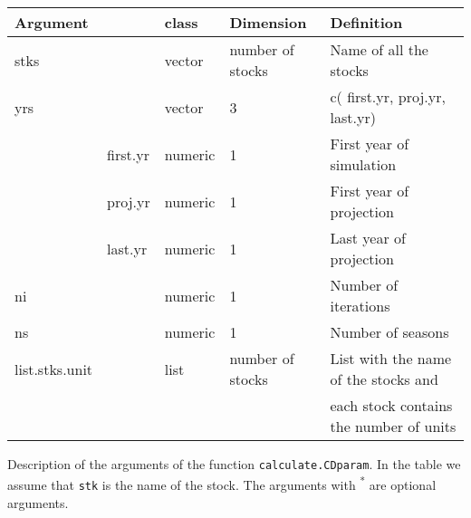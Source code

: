 \begin{landscape}
\begin{table}[!ht]
\begin{footnotesize}
    \begin{tabular}{lllll} %
      \hline 
      Argument & & class & Dimension & Definition\\
      \hline
      stks & & vector & number of stocks &	Name of all the stocks\\
      yrs & & vector & 3 &	c( first.yr, proj.yr, last.yr)\\
        & first.yr & numeric & 1 & First year of simulation\\
        & proj.yr  & numeric & 1 & First year of projection\\
        & last.yr  & numeric & 1 & Last year of projection\\
      ni & & numeric &	1 &	Number of iterations\\
      ns & & numeric &	1 &	Number of seasons\\
      list.stks.unit & & list & number of stocks &	List with the name of the stocks and\\
       & & & & each stock contains the number of units\\
      \hline
    \end{tabular}
      
  \end{footnotesize}

\end{table}



\begin{table}[!ht]

  \centering
  \begin{footnotesize}
    
    \caption{Description of the arguments of the function \texttt{calculate.CDparam}. 
      In the table we assume that \texttt{stk} is the name of the stock. 
      The arguments with \textsuperscript{*} are optional arguments.}
    
    \label{tb:A4.table9}
    
    \begin{threeparttable}
    

\end{threeparttable}
\end{footnotesize}
\end{table}
\end{landscape}
